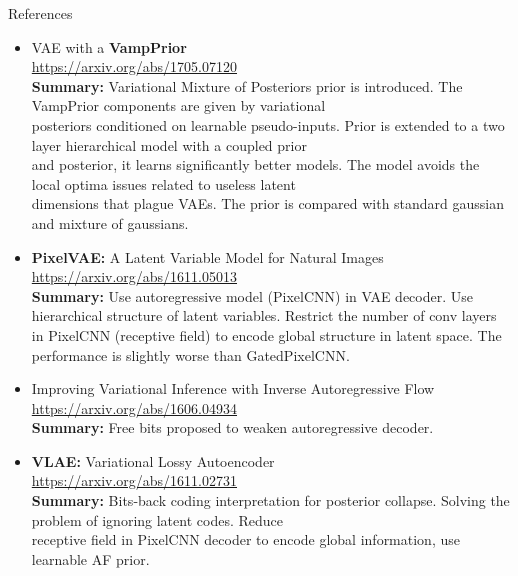 \documentclass{beamer}
\begin{document}
\begin{frame}{References}
{\tiny
\begin{itemize}
	
	\item VAE with a \textbf{VampPrior} \\
	\href{https://arxiv.org/abs/1705.07120}{https://arxiv.org/abs/1705.07120} \\
	\textbf{Summary:} Variational Mixture of Posteriors prior is introduced. The VampPrior components are given by variational \\ posteriors conditioned on learnable pseudo-inputs. Prior is extended to a two layer hierarchical model with a coupled prior \\ and posterior, it learns significantly better models. The model avoids the local optima issues related to useless latent \\ dimensions that plague VAEs. The prior is compared with standard gaussian and mixture of gaussians.
	
    \item \textbf{PixelVAE:} A Latent Variable Model for Natural Images \\
    \href{https://arxiv.org/abs/1611.05013}{https://arxiv.org/abs/1611.05013} \\
    \textbf{Summary:} Use autoregressive model (PixelCNN) in VAE decoder. Use hierarchical structure of latent variables. Restrict the number of conv layers in PixelCNN (receptive field) to encode global structure in latent space. The performance is slightly worse than GatedPixelCNN.
    
    \item Improving Variational Inference with Inverse Autoregressive Flow \\
    \href{https://arxiv.org/abs/1606.04934}{https://arxiv.org/abs/1606.04934} \\
    \textbf{Summary:} Free bits proposed to weaken autoregressive decoder.
    
    \item \textbf{VLAE:} Variational Lossy Autoencoder \\
    \href{https://arxiv.org/abs/1611.02731}{https://arxiv.org/abs/1611.02731} \\
    \textbf{Summary:} Bits-back coding interpretation for posterior collapse. Solving the problem of ignoring latent codes. Reduce \\ receptive field in PixelCNN decoder to encode global information, use learnable AF prior.
    

\end{itemize}}
\end{frame}
\end{document}
